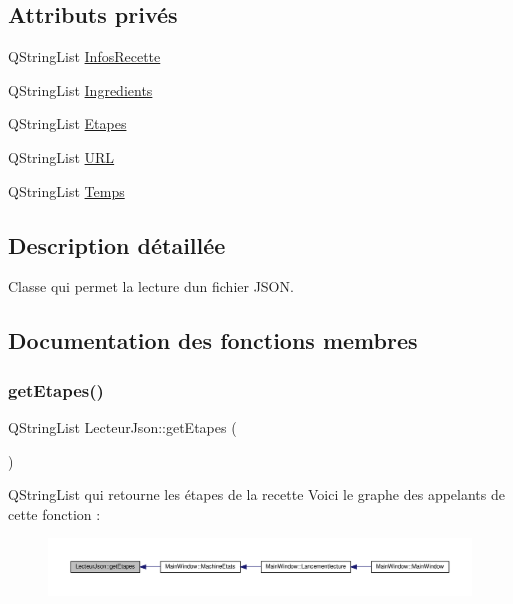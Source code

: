 \subsection*{Attributs privés}
\begin{DoxyCompactItemize}
\item 
Q\+String\+List \hyperlink{class_lecteur_json_a567a5bb99e9883f7906a89a46e322495}{Infos\+Recette}
\item 
Q\+String\+List \hyperlink{class_lecteur_json_a0648021cfe10db3555625e63c14961f9}{Ingredients}
\item 
Q\+String\+List \hyperlink{class_lecteur_json_a9328054d9a7e7f446cb047cab54c7b45}{Etapes}
\item 
Q\+String\+List \hyperlink{class_lecteur_json_ac4e3585c5c083c669273346ac6910353}{U\+RL}
\item 
Q\+String\+List \hyperlink{class_lecteur_json_a46972b215d8f7d30f68e7cf9c5711fc1}{Temps}
\end{DoxyCompactItemize}


\subsection{Description détaillée}
Classe qui permet la lecture d\textquotesingle{}un fichier J\+S\+ON. 

\subsection{Documentation des fonctions membres}
\mbox{\label{class_lecteur_json_ab698142bf586bb224c35962525ce3915}} 
\subsubsection{\texorpdfstring{get\+Etapes()}{getEtapes()}}
{\footnotesize\ttfamily Q\+String\+List Lecteur\+Json\+::get\+Etapes (\begin{DoxyParamCaption}{ }\end{DoxyParamCaption})\hspace{0.3cm}{\ttfamily [inline]}}

Q\+String\+List qui retourne les étapes de la recette Voici le graphe des appelants de cette fonction \+:
\nopagebreak
\begin{figure}[H]
\begin{center}
\leavevmode
\includegraphics[width=350pt]{class_lecteur_json_ab698142bf586bb224c35962525ce3915_icgraph}
\end{center}
\end{figure}
\mbox{\label{class_lecteur_json_a0c507870050e16de3688d310d1f3b65a}} 
